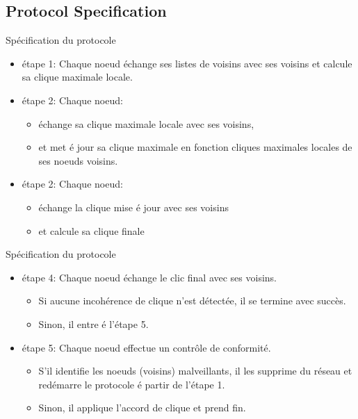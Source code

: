 \documentclass[12pt, c]{beamer}
\begin{document}
			\subsection{Protocol Specification}
				\begin{frame}{Spécification du protocole}
					\transwipe
					\vspace{-0.21cm}
					\begin{block}{}
							\begin{itemize}
								\item[\ding{43}] étape 1: Chaque noeud échange ses listes de voisins avec ses voisins et calcule sa clique maximale locale.
								\item[\ding{43}]étape 2: Chaque noeud:
									\begin{itemize}
										\item échange sa clique maximale locale avec ses voisins,
										\item et met é jour sa clique maximale en fonction  cliques maximales locales de ses noeuds voisins.
									\end{itemize}
								\item[\ding{43}] étape 2: Chaque noeud: 
										\begin{itemize}
										\item échange la clique mise é jour avec ses voisins
										\item et calcule sa clique finale
									\end{itemize}
							\end{itemize}
					\end{block}
				\end{frame}
				\begin{frame}{Spécification du protocole}
					\transwipe
					\vspace{-0.21cm}
					\begin{block}{}
							\begin{itemize}
								\item[\ding{43}]étape 4: Chaque noeud échange le clic final avec ses voisins.
								
									\begin{itemize}
										\item Si aucune incohérence de clique n'est détectée, il se termine avec succès.
										\item
Sinon, il entre é l'étape 5.
									\end{itemize}
								
								 
								\item[\ding{43}]étape 5: Chaque noeud effectue un contrôle de conformité.
									\begin{itemize}
										\item 
S'il identifie les noeuds (voisins) malveillants, il les supprime du réseau et redémarre le protocole é partir de l'étape 1.
										\item Sinon, il applique l'accord de clique et prend fin.
									\end{itemize}									 

							\end{itemize}
					\end{block}
				\end{frame}
\end{document}
